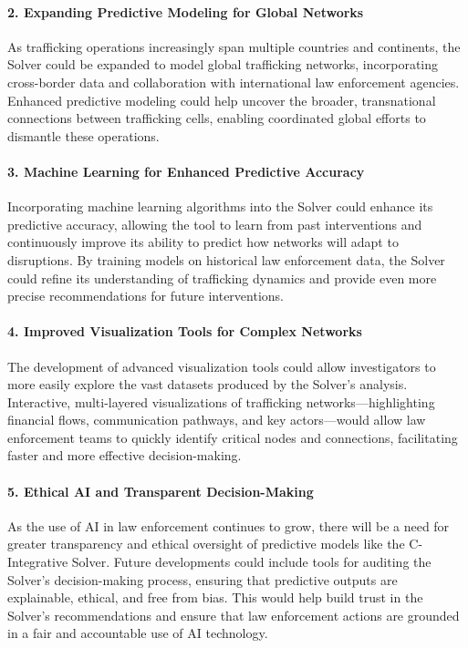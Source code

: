 \documentclass[%
 preprint, linenumbers,
 amsmath,amssymb,
 aps, physrev,
]{revtex4-2}
\begin{document}
\paragraph{2. Expanding Predictive Modeling for Global Networks}
As trafficking operations increasingly span multiple countries and continents, the Solver could be expanded to model global trafficking networks, incorporating cross-border data and collaboration with international law enforcement agencies. Enhanced predictive modeling could help uncover the broader, transnational connections between trafficking cells, enabling coordinated global efforts to dismantle these operations.

\paragraph{3. Machine Learning for Enhanced Predictive Accuracy}
Incorporating machine learning algorithms into the Solver could enhance its predictive accuracy, allowing the tool to learn from past interventions and continuously improve its ability to predict how networks will adapt to disruptions. By training models on historical law enforcement data, the Solver could refine its understanding of trafficking dynamics and provide even more precise recommendations for future interventions.

\paragraph{4. Improved Visualization Tools for Complex Networks}
The development of advanced visualization tools could allow investigators to more easily explore the vast datasets produced by the Solver’s analysis. Interactive, multi-layered visualizations of trafficking networks—highlighting financial flows, communication pathways, and key actors—would allow law enforcement teams to quickly identify critical nodes and connections, facilitating faster and more effective decision-making.

\paragraph{5. Ethical AI and Transparent Decision-Making}
As the use of AI in law enforcement continues to grow, there will be a need for greater transparency and ethical oversight of predictive models like the C-Integrative Solver. Future developments could include tools for auditing the Solver’s decision-making process, ensuring that predictive outputs are explainable, ethical, and free from bias. This would help build trust in the Solver’s recommendations and ensure that law enforcement actions are grounded in a fair and accountable use of AI technology.
\end{document}
